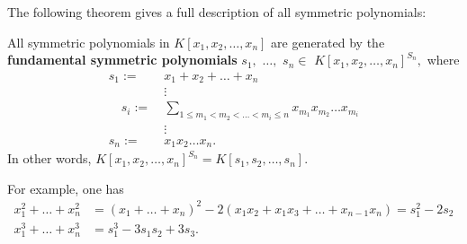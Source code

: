 The following theorem gives a full description of all symmetric polynomials:
\begin{theorem} \label{thm-FTSP}
All symmetric polynomials in $K[x_1, x_2, \dots, x_n]$ are generated by the {\bf fundamental symmetric polynomials} 
$s_1,$ $\dots,$ $s_n \in$ $K[x_1, x_2, \dots, x_n]^{S_n},$ where
\begin{align*}
s_1 :=\ &x_1 + x_2 + \ldots + x_n \\
&\vdots \\ 
\quad s_i :=\ &\sum_{1 \leq m_1 < m_2 < \dots < m_i \leq n} x_{m_1}x_{m_2}\dots x_{m_i} \\
&\vdots \\  
s_n :=\ &x_1x_2 \ldots x_n.
\end{align*}
In other words, $K[x_1, x_2, \dots, x_n]^{S_n} = K[s_1, s_2, \dots, s_n]$.
\end{theorem}
For example, one has
\begin{align*}
x_1^2 + \dots + x_n^2 &= (x_1 + \dots + x_n)^2 - 2(x_1x_2 + x_1x_3 + \dots + x_{n-1}x_n) = s_1^2 - 2s_2 \\ 
x_1^3 + \dots + x_n^3 &= s_1^3 - 3s_1s_2 + 3s_3.
\end{align*}





